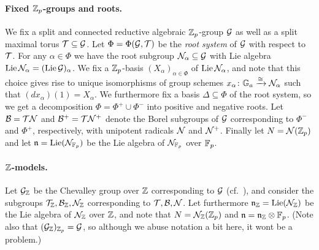 \paragraph{Fixed $\mathbb{Z}_{p}$-groups and roots.} We fix a split and connected reductive algebraic $\mathbb{Z}_{p}$-group $\mathcal{G}$ as well as a split maximal torus $\mathcal{T} \subseteq \mathcal{G}$. Let $\Phi = \Phi(\mathcal{G},\mathcal{T})$ be the \emph{root system} of $\mathcal{G}$ with respect to $\mathcal{T}$. For any $\alpha \in \Phi$ we have the root subgroup $\mathcal{N}_{\alpha} \subseteq \mathcal{G}$ with Lie algebra $\operatorname{Lie} \mathcal{N}_{\alpha} =  (\operatorname{Lie} \mathcal{G})_{\alpha}$. We fix a $\mathbb{Z}_{p}$-basis $(X_{\alpha})_{\alpha \in \Phi}$ of $\operatorname{Lie} \mathcal{N}_{\alpha}$, and note that this choice gives rise to unique isomorphisms of group schemes $x_{\alpha} \colon \mathbb{G}_{a} \xrightarrow{\cong} \mathcal{N}_{\alpha}$ such that $(dx_\alpha)(1) = X_\alpha$. We furthermore fix a basis $\Delta \subseteq \Phi$ of the root system, so we get a decomposition $\Phi = \Phi^+ \cup \Phi^-$ into positive and negative roots. Let $\mathcal{B} = \mathcal{T}\mathcal{N}$ and $\mathcal{B}^+ = \mathcal{T}\mathcal{N}^+$ denote the Borel subgroups of $\mathcal{G}$ corresponding to $\Phi^-$ and $\Phi^+$, respectively, with unipotent radicals $\mathcal{N}$ and $\mathcal{N}^+$. Finally let $N = \mathcal{N}(\mathbb{Z}_{p})$ and let $\mathfrak{n} = \operatorname{Lie}(\mathcal{N}_{\mathbb{F}_p})$ be the Lie algebra of $\mathcal{N}_{\mathbb{F}_p}$ over $\mathbb{F}_p$.

\paragraph{$\mathbb{Z}$-models.} Let $\mathcal{G}_{\mathbb{Z}}$ be the Chevalley group over $\mathbb{Z}$ corresponding to $\mathcal{G}$ (cf.\ \cite[§1]{Con}), and consider the subgroups $\mathcal{T}_{\mathbb{Z}},\mathcal{B}_{\mathbb{Z}},\mathcal{N}_{\mathbb{Z}}$ corresponding to $\mathcal{T},\mathcal{B},\mathcal{N}$. Let furthermore $\mathfrak{n}_{\mathbb{Z}} = \operatorname{Lie}(\mathcal{N}_{\mathbb{Z}})$ be the Lie algebra of $\mathcal{N}_{\mathbb{Z}}$ over $\mathbb{Z}$, and note that $N = \mathcal{N}_{\mathbb{Z}}(\mathbb{Z}_{p})$ and $\mathfrak{n} =  \mathfrak{n}_{\mathbb{Z}} \otimes \mathbb{F}_{p}$. (Note also that $(\mathcal{G}_{\mathbb{Z}})_{\mathbb{Z}_{p}} = \mathcal{G}$, so although we abuse notation a bit here, it wont be a problem.)

